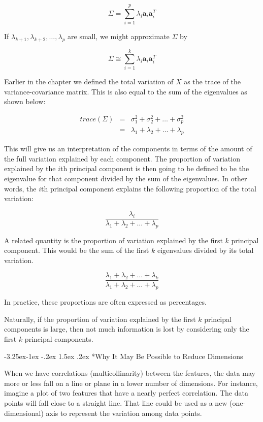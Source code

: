 \documentclass[]{book}
\makeatletter
\renewcommand\subsection{\@startsection{subsection}{2}{\z@}%
                                     {-3.25ex\@plus -1ex \@minus -.2ex}%
                                     {1.5ex \@plus .2ex}%
                                     {\normalfont\large\bfseries\color{Violet}}}
\theoremstyle{definition}
\theoremstyle{definition}
\theoremstyle{definition}
\theoremstyle{remark}
\makeatother
\begin{document}
\[ \Sigma  =  \sum_{i=1}^{p}\lambda_i \mathbf{a}_i \mathbf{a}_i^T \]

If \(\lambda_{k+1}, \lambda_{k+2}, \dots , \lambda_{p}\) are small, we
might approximate \(\Sigma\) by

\[ \Sigma  \cong  \sum_{i=1}^{k}\lambda_i \mathbf{a}_i\mathbf{a}_i^T \]

Earlier in the chapter we defined the total variation of \(X\) as the
trace of the variance-covariance matrix. This is also equal to the sum
of the eigenvalues as shown below:

\[ \begin{array}{lll}trace(\Sigma) & = & \sigma^2_1 + \sigma^2_2 + \dots +\sigma^2_p \\ & = & \lambda_1 + \lambda_2 + \dots + \lambda_p\end{array} \]

This will give us an interpretation of the components in terms of the
amount of the full variation explained by each component. The proportion
of variation explained by the \(i\)th principal component is then going
to be defined to be the eigenvalue for that component divided by the sum
of the eigenvalues. In other words, the \(i\)th principal component
explains the following proportion of the total variation:

\[ \frac{\lambda_i}{\lambda_1 + \lambda_2 + \dots + \lambda_p} \]

A related quantity is the proportion of variation explained by the first
\(k\) principal component. This would be the sum of the first \(k\)
eigenvalues divided by its total variation.

\[ \frac{\lambda_1 + \lambda_2 + \dots + \lambda_k}{\lambda_1 + \lambda_2 + \dots + \lambda_p} \]

In practice, these proportions are often expressed as percentages.

Naturally, if the proportion of variation explained by the first \(k\)
principal components is large, then not much information is lost by
considering only the first \(k\) principal components.

\subsection*{Why It May Be Possible to Reduce
Dimensions}\label{why-it-may-be-possible-to-reduce-dimensions}

When we have correlations (multicollinarity) between the features, the
data may more or less fall on a line or plane in a lower number of
dimensions. For instance, imagine a plot of two features that have a
nearly perfect correlation. The data points will fall close to a
straight line. That line could be used as a new (one-dimensional) axis
to represent the variation among data points.
\end{document}
